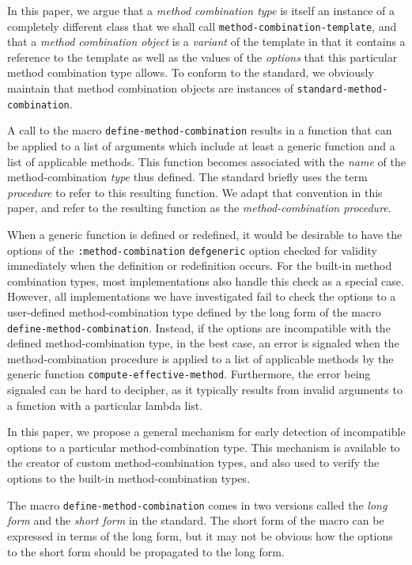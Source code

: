 In this paper, we argue that a \emph{method combination type} is
itself an instance of a completely different class that we shall call
\texttt{method-combination-template}, and that a \emph{method
  combination object} is a \emph{variant} of the template in that it
contains a reference to the template as well as the values of the
\emph{options} that this particular method combination type allows.
To conform to the standard, we obviously maintain that method
combination objects are instances of
\texttt{standard-method-combination}.

A call to the macro \texttt{define-method-combination} results in a
function that can be applied to a list of arguments which include at
least a generic function and a list of applicable methods.  This
function becomes associated with the \emph{name} of the
method-combination \emph{type} thus defined.  The standard briefly
uses the term \emph{procedure} to refer to this resulting function.
We adapt that convention in this paper, and refer to the resulting
function as the \emph{method-combination procedure}.

When a generic function is defined or redefined, it would be desirable
to have the options of the \texttt{:method-combination}
\texttt{defgeneric} option checked for validity immediately when the
definition or redefinition occurs.  For the built-in method
combination types, most implementations also handle this check as a
special case.  However, all implementations we have investigated fail
to check the options to a user-defined method-combination type defined
by the long form of the macro \texttt{define-method-combination}.
Instead, if the options are incompatible with the defined
method-combination type, in the best case, an error is signaled when
the method-combination procedure is applied to a list of applicable
methods by the generic function \texttt{compute-effective-method}.
Furthermore, the error being signaled can be hard to decipher, as it
typically results from invalid arguments to a function with a
particular lambda list.

In this paper, we propose a general mechanism for early detection of
incompatible options to a particular method-combination type.  This
mechanism is available to the creator of custom method-combination
types, and also used to verify the options to the built-in
method-combination types.

The macro \texttt{define-method-combination} comes in two versions
called the \emph{long form} and the \emph{short form} in the
\commonlisp{} standard.  The short form of the macro can be expressed
in terms of the long form, but it may not be obvious how the options
to the short form should be propagated to the long form.

